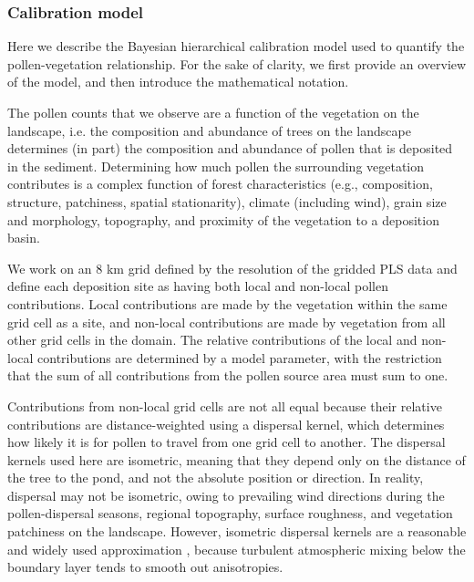 \documentclass[12pt]{article}
\begin{document}

\subsubsection{Calibration model}
\label{sec:cal}

Here we describe the Bayesian hierarchical calibration model used to
quantify the pollen-vegetation relationship. For the sake of clarity,
we first provide an overview of the model, and then introduce the
mathematical notation.

The pollen counts that we observe are a function of the vegetation on
the landscape, i.e. the composition and abundance of trees on the
landscape determines (in part) the composition and abundance of pollen
that is deposited in the sediment. Determining how much pollen the
surrounding vegetation contributes is a complex function of forest
characteristics (e.g., composition, structure, patchiness, spatial
stationarity), climate (including wind), grain size and morphology,
topography, and proximity of the vegetation to a deposition basin.

We work on an 8 km grid defined by the resolution of the gridded PLS
data and define each deposition site as having both local and
non-local pollen contributions. Local contributions are made by the
vegetation within the same grid cell as a site, and non-local
contributions are made by vegetation from all other grid cells in the
domain. The relative contributions of the local and non-local
contributions are determined by a model parameter, with the
restriction that the sum of all contributions from the pollen source
area must sum to one.

Contributions from non-local grid cells are not all equal because
their relative contributions are distance-weighted using a dispersal
kernel, which determines how likely it is for pollen to travel from
one grid cell to another. The dispersal kernels used here are
isometric, meaning that they depend only on the distance of the tree
to the pond, and not the absolute position or direction. In reality,
dispersal may not be isometric, owing to prevailing wind directions
during the pollen-dispersal seasons, regional topography, surface
roughness, and vegetation patchiness on the landscape. However,
isometric dispersal kernels are a reasonable and widely used
approximation \citep{XXX}, because turbulent atmospheric mixing below
the boundary layer tends to smooth out anisotropies.
\end{document}
